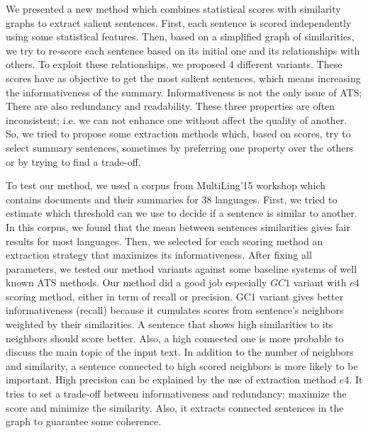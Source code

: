 We presented a new method which combines statistical scores with similarity graphs to extract salient sentences. 
First, each sentence is scored independently using some statistical features. 
Then, based on a simplified graph of similarities, we try to re-score each sentence based on its initial one and its relationships with others. 
To exploit these relationships, we proposed 4 different variants. 
These scores have as objective to get the most salient sentences, which means increasing the informativeness of the summary. 
Informativeness is not the only issue of ATS; There are also redundancy and readability. 
These three properties are often inconsistent; i.e. we can not enhance one without affect the quality of another. 
So, we tried to propose some extraction methods which, based on scores, try to select summary sentences, sometimes by preferring one property over the others or by trying to find a trade-off. 

To test our method, we used a corpus from MultiLing'15 workshop which contains documents and their summaries for 38 languages.
First, we tried to estimate which threshold can we use to decide if a sentence is similar to another. 
In this corpus, we found that the mean between sentences similarities gives fair results for most languages. 
Then, we selected for each scoring method an extraction strategy that maximizes its informativeness. 
After fixing all parameters, we tested our method variants against some baseline systems of well known ATS methods. 
Our method did a good job especially $ GC1 $ variant with $ e4 $ scoring method, either in term of recall or precision.
GC1 variant gives better informativeness (recall) because it cumulates scores from sentence's neighbors weighted by their similarities. 
A sentence that shows high similarities to its neighbors should score better. 
Also, a high connected one is more probable to discuss the main topic of the input text. 
In addition to the number of neighbors and similarity, a sentence connected to high scored neighbors is more likely to be important. 
High precision can be explained by the use of extraction method $ e4 $. 
It tries to set a trade-off between informativeness and redundancy: maximize the score and minimize the similarity. 
Also, it extracts connected sentences in the graph to guarantee some coherence. 